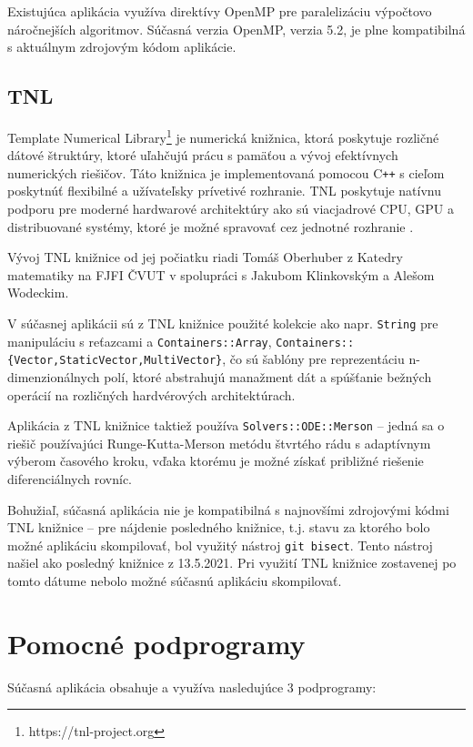 Existujúca aplikácia využíva direktívy OpenMP pre paralelizáciu výpočtovo náročnejších algoritmov. Súčasná verzia OpenMP, verzia 5.2, je plne kompatibilná s aktuálnym zdrojovým kódom aplikácie.

\subsection {TNL}\label{tnl}
Template Numerical Library\footnote{https://tnl-project.org} je numerická knižnica, ktorá poskytuje rozličné dátové štruktúry, ktoré uľahčujú prácu s pamäťou a vývoj efektívnych numerických riešičov. Táto knižnica je implementovaná pomocou C\texttt{++} s cieľom poskytnúť flexibilné a užívateľsky prívetivé rozhranie. TNL poskytuje natívnu podporu pre moderné hardwarové architektúry ako sú viacjadrové CPU, GPU a distribuované systémy, ktoré je možné spravovať cez jednotné rozhranie \cite{tnl_description}.

Vývoj TNL knižnice od jej počiatku riadi Tomáš Oberhuber z Katedry matematiky na FJFI ČVUT v spolupráci s Jakubom Klinkovským a Alešom Wodeckim.

V súčasnej aplikácii sú z TNL knižnice použité kolekcie ako napr. \texttt{String} pre manipuláciu s reťazcami a \texttt{Containers::Array}, \texttt{Containers::\{Vector,\newline StaticVector,MultiVector\}}, čo sú šablóny pre reprezentáciu \newline n-dimenzionálnych polí, ktoré abstrahujú manažment dát a spúšťanie bežných operácií na rozličných hardvérových architektúrach.

Aplikácia z TNL knižnice taktiež používa \texttt{Solvers::ODE::Merson} -- jedná sa o riešič používajúci Runge-Kutta-Merson metódu štvrtého rádu s adaptívnym výberom časového kroku, vďaka ktorému je možné získať približné riešenie diferenciálnych rovníc.

\clearpage

Bohužiaľ, súčasná aplikácia nie je kompatibilná s najnovšími zdrojovými kódmi TNL knižnice -- pre nájdenie posledného  knižnice, t.j. stavu za ktorého bolo možné aplikáciu skompilovať, bol využitý nástroj \texttt{git bisect}. Tento nástroj našiel ako posledný  knižnice z 13.5.2021. Pri využití TNL knižnice zostavenej po tomto dátume nebolo možné súčasnú aplikáciu skompilovať.

\section {Pomocné podprogramy}\label{helper_apps}
Súčasná aplikácia obsahuje a využíva nasledujúce 3 podprogramy:

